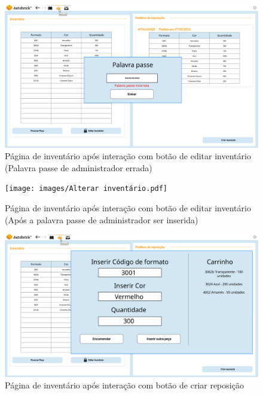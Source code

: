         \begin{figure}[h!]
            \centering
            \includegraphics[width=0.99\linewidth, frame]{images/Admin Menu Alteração.pdf}
            \caption{Página de inventário após interação com botão de editar inventário (Palavra passe de administrador errada)}
            \label{fig:EditarInv1}
        \end{figure}
    
        \begin{figure}[h!]
            \centering
            \texttt{[image: images/Alterar inventário.pdf]}
            \caption{Página de inventário após interação com botão de editar inventário (Após a palavra passe de administrador ser inserida)}
            \label{fig:EditarInv2}
        \end{figure}

        \clearpage    
        \begin{figure}
            \centering
            \includegraphics[width=0.99\linewidth, frame]{images/Restock Manual.pdf}
            \caption{Página de inventário após interação com botão de criar reposição}
            \label{fig:Reposição}
        \end{figure}

